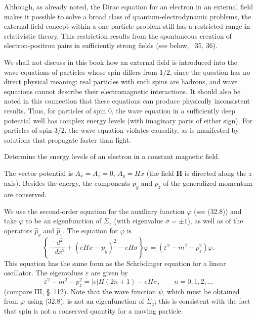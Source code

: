 Although, as already noted, the Dirac equation for an electron in an external field makes it possible to solve a broad class of quantum-electrodynamic problems, the external-field concept within a one-particle problem still has a restricted range in relativistic theory. This restriction results from the spontaneous creation of electron-positron pairs in sufficiently strong fields (see below, \SS~35, 36).

We shall not discuss in this book how an external field is introduced into the wave equations of particles whose spin differs from $1/2$, since the question has no direct physical meaning: real particles with such spins are hadrons, and wave equations cannot describe their electromagnetic interactions. It should also be noted in this connection that these equations can produce physically inconsistent results. Thus, for particles of spin 0, the wave equation in a sufficiently deep potential well has complex energy levels (with imaginary parts of either sign). For particles of spin $3/2$, the wave equation violates causality, as is manifested by solutions that propagate faster than light.

\ProblemHeading

Determine the energy levels of an electron in a constant magnetic field.

\SolutionHeading The vector potential is $A_x=A_z=0$, $A_y=Hx$ (the field $\mathbf H$ is directed along the $z$ axis). Besides the energy, the components $p_y$ and $p_z$ of the generalized momentum are conserved.

We use the second-order equation for the auxiliary function $\varphi$ (see (32.8)) and take $\varphi$ to be an eigenfunction of $\Sigma_z$ (with eigenvalue $\sigma=\pm1$), as well as of the operators $\hat p_y$ and $\hat p_z$. The equation for $\varphi$ is
\[
\left\{-\frac{d^2}{dx^2}+(eHx-p_y)^2-eH\sigma\right\}\varphi
=(\varepsilon^2-m^2-p_z^2)\varphi.
\]
This equation has the same form as the Schrödinger equation for a linear oscillator. The eigenvalues $\varepsilon$ are given by
\[
\varepsilon^2-m^2-p_z^2=|e|H(2n+1)-eH\sigma,
\qquad n=0,1,2,\ldots
\]
(compare III, \S~112). Note that the wave function $\psi$, which must be obtained from $\varphi$ using (32.8), is not an eigenfunction of $\Sigma_z$; this is consistent with the fact that spin is not a conserved quantity for a moving particle.

